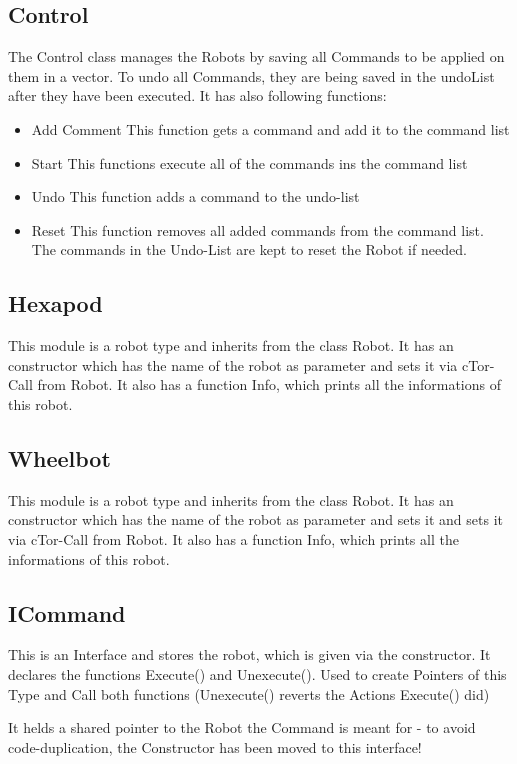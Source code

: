 \subsection{Control}
The Control class manages the Robots by saving all Commands to be applied on them in a vector. To undo all Commands, they are being saved in the undoList after they have been executed.
It has also following functions:
\begin{itemize}
	\item Add Comment
		\subitem This function gets a command and add it to the command list
	\item Start
		\subitem This functions execute all of the commands ins the command list
	\item Undo
		\subitem This function adds a command to the undo-list
	\item Reset
		\subitem This function removes all added commands from the command list. The commands in the Undo-List are kept to reset the Robot if needed.
\end{itemize}

\subsection{Hexapod}
This module is a robot type and inherits from the class Robot. It has an constructor which has the name of the robot as parameter and sets it via cTor-Call from Robot.
It also has a function Info, which prints all the informations of this robot.

\subsection{Wheelbot}
This module is a robot type and inherits from the class Robot. It has an constructor which has the name of the robot as parameter and sets it and sets it via cTor-Call from Robot.
It also has a function Info, which prints all the informations of this robot.

\subsection{ICommand}
This is an Interface and stores the robot, which is given via the constructor.
It declares the functions Execute() and Unexecute(). 
Used to create Pointers of this Type and Call both functions (Unexecute() reverts the Actions Execute() did)

It helds a shared pointer to the Robot the Command is meant for - to avoid code-duplication, the Constructor has been moved to this interface!

